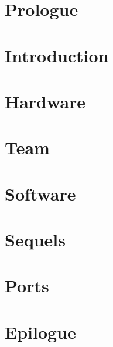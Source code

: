 \documentclass[8pt]{book}
\begin{document}
    
    \tableofcontents
    
    \pagebreak


    \chapter*{Prologue}
      


    \chapter{Introduction}
      
  
    \chapter{Hardware}
      

  
    \chapter{Team}
      
      
    \chapter{Software}
       
       
      
       
       
      
       
    
  
           


\chapter{Sequels}
        
        

    \chapter{Ports}        
        
        
    
       \chapter{Epilogue}
        

        \appendix
    \appendixpage
\end{document}
